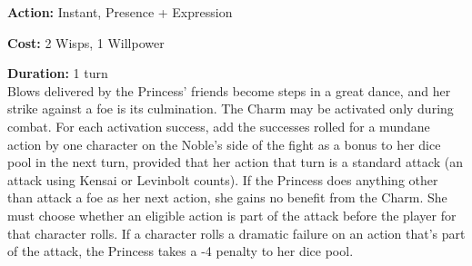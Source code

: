 \noindent \textbf{Action:} Instant, Presence + Expression

\noindent \textbf{Cost:} 2 Wisps, 1 Willpower

\noindent \textbf{Duration:} 1 turn\\

\noindent Blows delivered by the Princess' friends become steps in a great dance, and her strike against a foe is its culmination. The Charm may be activated only during combat. For each activation success, add the successes rolled for a mundane action by one character on the Noble's side of the fight as a bonus to her dice pool in the next turn, provided that her action that turn is a standard attack (an attack using Kensai or Levinbolt counts). If the Princess does anything other than attack a foe as her next action, she gains no benefit from the Charm. She must choose whether an eligible action is part of the attack before the player for that character rolls. If a character rolls a dramatic failure on an action that's part of the attack, the Princess takes a -4 penalty to her dice pool.
